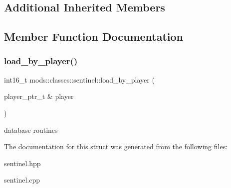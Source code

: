 \subsection*{Additional Inherited Members}


\subsection{Member Function Documentation}
\mbox{\label{structmods_1_1classes_1_1sentinel_a5065711e4b84a36b6c14d7c878322562}} 
\subsubsection{\texorpdfstring{load\+\_\+by\+\_\+player()}{load\_by\_player()}}
{\footnotesize\ttfamily int16\+\_\+t mods\+::classes\+::sentinel\+::load\+\_\+by\+\_\+player (\begin{DoxyParamCaption}\item[{player\+\_\+ptr\+\_\+t \&}]{player }\end{DoxyParamCaption})}

database routines 

The documentation for this struct was generated from the following files\+:\begin{DoxyCompactItemize}
\item 
sentinel.\+hpp\item 
sentinel.\+cpp\end{DoxyCompactItemize}
